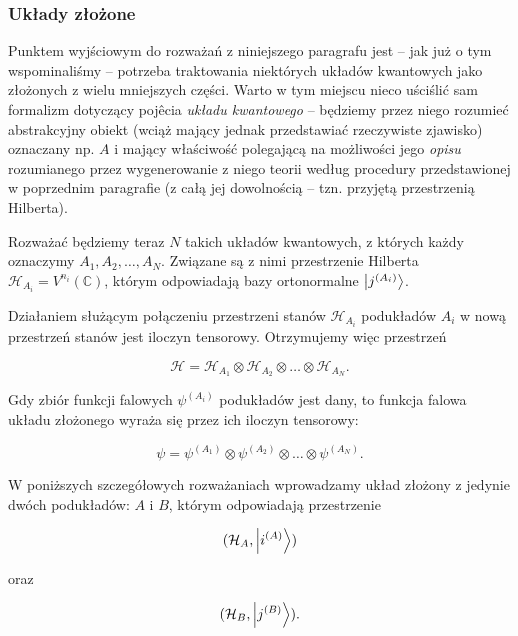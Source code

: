 \subsubsection{Układy złożone}

Punktem wyjściowym do rozważań z niniejszego paragrafu jest -- jak już o tym wspominaliśmy -- potrzeba traktowania niektórych układów kwantowych jako złożonych z wielu mniejszych części. Warto w tym miejscu nieco uściślić sam formalizm dotyczący pojêcia \textit{układu kwantowego} -- będziemy przez niego rozumieć abstrakcyjny obiekt (wciąż mający jednak przedstawiać rzeczywiste zjawisko) oznaczany np. $A$ i mający właściwość polegającą na możliwości jego \textit{opisu} rozumianego przez wygenerowanie z niego teorii według procedury przedstawionej w poprzednim paragrafie (z całą jej dowolnością -- tzn. przyjętą przestrzenią Hilberta).

Rozważać będziemy teraz $N$ takich układów kwantowych, z których każdy oznaczymy $A_1, A_2, \ldots, A_N$. Związane są z nimi przestrzenie Hilberta $\mathcal{H}_{A_i} = V ^ {n_i}(\mathbb{C})$, którym odpowiadają bazy ortonormalne $\ket{j^{(A_i)}}$.

\begin{definition}
    \label{definition:complex-system}
    Działaniem służącym połączeniu przestrzeni stanów $\mathcal{H}_{A_i}$ podukładów $A_i$ w nową przestrzeń stanów jest iloczyn tensorowy. Otrzymujemy więc przestrzeń

    $$
        \mathcal{H} = \mathcal{H}_{A_1} \otimes \mathcal{H}_{A_2} \otimes \ldots \otimes \mathcal{H}_{A_N}.
    $$

    Gdy zbiór funkcji falowych $\psi ^ {(A_i)}$ podukładów jest dany, to funkcja falowa układu złożonego wyraża się przez ich iloczyn tensorowy:

    \begin{equation}
        \label{equation:productstate}
        \psi=\psi ^ {(A_1)} \otimes \psi ^ {(A_2)} \otimes \ldots \otimes \psi^{(A_N)}.
    \end{equation}
\end{definition}

W poniższych szczegółowych rozważaniach wprowadzamy układ złożony z jedynie dwóch podukładów: $A$ i $B$, którym odpowiadają przestrzenie

$$
    (\mathcal{H}_A, \ket{i^{(A)}})
$$

oraz

$$
    (\mathcal{H}_B, \ket{j^{(B)}}).
$$

